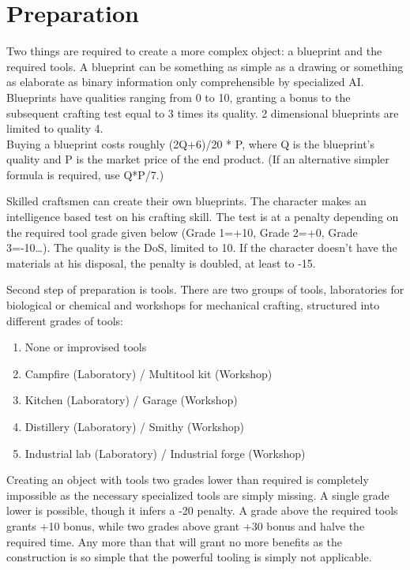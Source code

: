 \documentclass[12pt,a4paper,openany]{book}
\begin{document}
	\chapter{Preparation}
	Two things are required to create a more complex object: a blueprint and the required tools.
	A blueprint can be something as simple as a drawing or something as elaborate as binary information only comprehensible by specialized AI. Blueprints have qualities ranging from 0 to 10, granting a bonus to the subsequent crafting test equal to 3 times its quality. 2 dimensional blueprints are limited to quality 4.\\
	Buying a blueprint costs roughly (2Q+6)/20 * P, where Q is the blueprint’s quality and P is the market price of the end product. (If an alternative simpler formula is required, use Q*P/7.)\par
	Skilled craftsmen can create their own blueprints. The character makes an intelligence based test on his crafting skill. The test is at a penalty depending on the required tool grade given below (Grade 1=+10, Grade 2=+0, Grade 3=-10…). The quality is the DoS, limited to 10. If the character doesn’t have the materials at his disposal, the penalty is doubled, at least to -15.\par
	Second step of preparation is tools. There are two groups of tools, laboratories for biological or chemical and workshops for mechanical crafting, structured into different grades of tools:
	\par
	\pagebreak %
	\begin{samepage}
		\begin{enumerate}
			\setlength\itemsep{-8mm}
			\item None or improvised tools
			\item Campfire (Laboratory) / Multitool kit (Workshop)
			\item Kitchen (Laboratory) / Garage (Workshop)
			\item Distillery (Laboratory) / Smithy (Workshop)
			\item Industrial lab (Laboratory) / Industrial forge (Workshop)
		\end{enumerate}
	\end{samepage}
	Creating an object with tools two grades lower than required is completely impossible as the necessary specialized tools are simply missing. A single grade lower is possible, though it infers a -20 penalty. A grade above the required tools grants +10 bonus, while two grades above grant +30 bonus and halve the required time. Any more than that will grant no more benefits as the construction is so simple that the powerful tooling is simply not applicable.\\
\end{document}
